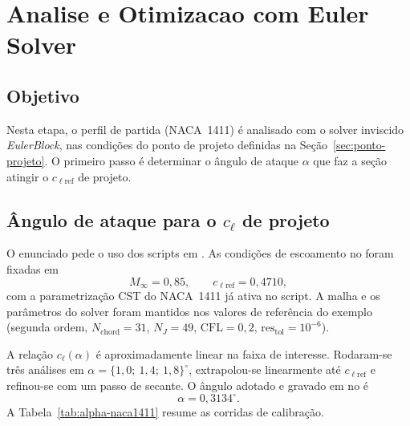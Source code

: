 
\section{Analise e Otimizacao com Euler Solver}
\label{sec:euler}

\subsection{Objetivo}

Nesta etapa, o perfil de partida (NACA~1411) é analisado com o solver
inviscido \emph{EulerBlock}, nas condições do ponto de projeto definidas
na Seção~\ref{sec:ponto-projeto}. O primeiro passo é determinar o ângulo
de ataque $\alpha$ que faz a seção atingir o $c_{\ell\mathrm{ref}}$ de
projeto.

\subsection{\^Angulo de ataque para o $c_\ell$ de projeto}

O enunciado pede o uso dos scripts em . As
condições de escoamento no  foram fixadas em
\begin{equation}
M_{\infty} = 0{,}85,
\qquad
c_{\ell\mathrm{ref}} = 0{,}4710,
\end{equation}
com a parametrização CST do NACA~1411 já ativa no script. A malha e os
parâmetros do solver foram mantidos nos valores de referência do
exemplo (segunda ordem, $N_{\mathrm{chord}}=31$,
$N_J=49$, $\mathrm{CFL}=0{,}2$,
$\mathrm{res}_{\mathrm{tol}}=10^{-6}$).

A relação $c_\ell(\alpha)$ é aproximadamente linear na faixa de
interesse. Rodaram-se três análises em $\alpha=\{1{,}0;\ 1{,}4;\ 1{,}8\}^\circ$,
extrapolou-se linearmente até $c_{\ell\mathrm{ref}}$ e refinou-se com
um passo de secante. O ângulo adotado e gravado em  no
 é
\begin{equation}
\alpha = 0{,}3134^\circ.
\end{equation}
A Tabela~\ref{tab:alpha-naca1411} resume as corridas de calibração.

